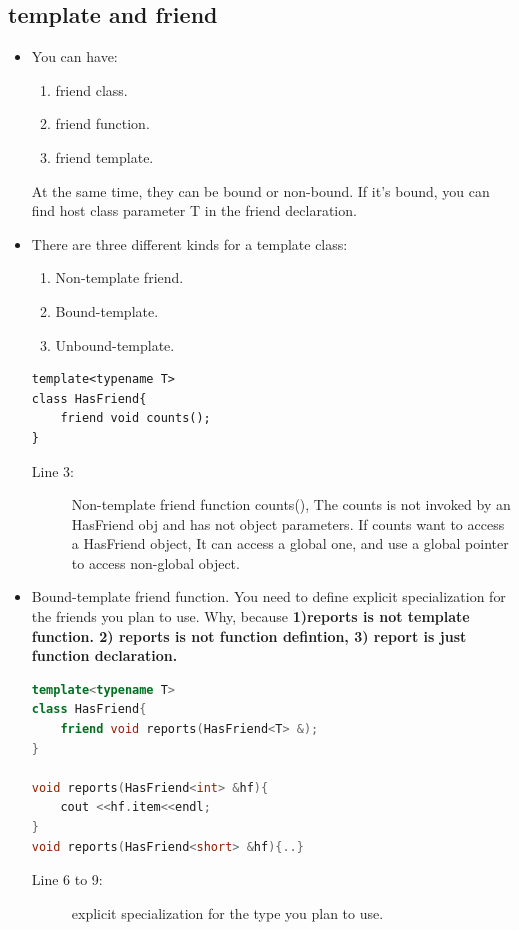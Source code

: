 \documentclass[a4paper,11pt,twoside]{book}
\begin{document}
\subsection{template and friend}
\begin{itemize}
	\item You can have:
	\begin{enumerate}
		\item friend class.
		\item friend function.
		\item friend template.
	\end{enumerate}

	At the same time, they can be bound or non-bound. If it's bound, you can find host class parameter T in the friend declaration. 
	
	\item  There are three different kinds for a template class:
	\begin{enumerate}
		\item Non-template friend.
		\item Bound-template.
		\item Unbound-template.
	\end{enumerate}

\begin{lstlisting}
template<typename T>
class HasFriend{
	friend void counts();
}
\end{lstlisting}
\begin{description}
	\item[Line 3:] Non-template friend function counts(), The counts is not invoked by an HasFriend obj and has not object parameters.  If counts want to access a HasFriend object, It can access a global one, and use a global pointer to access non-global object.
\end{description}
	
	\item Bound-template friend function. You need to define explicit specialization for the friends you plan to use. Why, because \textbf{1)reports is not template function. 2) reports is not function defintion, 3) report is just function declaration.}
	
\begin{lstlisting}[frame=single, language=c++]
template<typename T>
class HasFriend{
	friend void reports(HasFriend<T> &);
}
	
void reports(HasFriend<int> &hf){
	cout <<hf.item<<endl;
}
void reports(HasFriend<short> &hf){..}
\end{lstlisting}
\begin{description}
	\item[Line 6 to 9:] explicit specialization for the type you plan to use.
\end{description}
	

\end{itemize}
\end{document}

